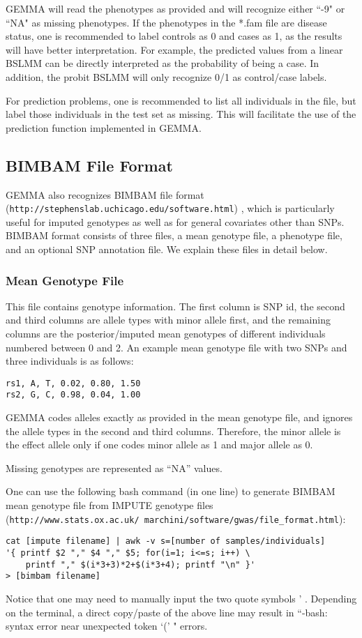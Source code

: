 \documentclass[11pt]{article}
\providecommand{\url}[1]{\texttt{#1}}
\begin{document}
GEMMA will read the phenotypes as provided and will recognize either
``-9" or ``NA" as missing phenotypes. If the phenotypes in the *.fam
file are disease status, one is recommended to label controls as 0 and
cases as 1, as the results will have better interpretation. For
example, the predicted values from a linear BSLMM can be directly
interpreted as the probability of being a case.  In addition, the
probit BSLMM will only recognize 0/1 as control/case labels.

For prediction problems, one is recommended to list all individuals in
the file, but label those individuals in the test set as missing. This
will facilitate the use of the prediction function implemented in
GEMMA.

\subsection{BIMBAM File Format}

GEMMA also recognizes BIMBAM file format
(\url{http://stephenslab.uchicago.edu/software.html})
\cite{Guan:2008}, which is particularly useful for imputed genotypes
as well as for general covariates other than SNPs. BIMBAM format
consists of three files, a mean genotype file, a phenotype file, and
an optional SNP annotation file. We explain these files in detail
below.

\subsubsection{Mean Genotype File}

This file contains genotype information. The first column is SNP id,
the second and third columns are allele types with minor allele first,
and the remaining columns are the posterior/imputed mean genotypes of
different individuals numbered between 0 and 2. An example mean
genotype file with two SNPs and three individuals is as follows:
%
\begin{verbatim}
rs1, A, T, 0.02, 0.80, 1.50
rs2, G, C, 0.98, 0.04, 1.00
\end{verbatim}
%
GEMMA codes alleles exactly as provided in the mean genotype file, and
ignores the allele types in the second and third columns. Therefore,
the minor allele is the effect allele only if one codes minor allele
as 1 and major allele as 0.

Missing genotypes are represented as ``NA'' values.

One can use the following bash command (in one line) to generate
BIMBAM mean genotype file from IMPUTE genotype files \\
(\url{http://www.stats.ox.ac.uk/~marchini/software/gwas/file_format.html})\cite{Howie:2009}:
%
\begin{verbatim}
cat [impute filename] | awk -v s=[number of samples/individuals]
'{ printf $2 "," $4 "," $5; for(i=1; i<=s; i++) \
    printf "," $(i*3+3)*2+$(i*3+4); printf "\n" }'
> [bimbam filename]
\end{verbatim}
%
Notice that one may need to manually input the two quote symbols '
. Depending on the terminal, a direct copy/paste of the above line may
result in ``-bash: syntax error near unexpected token `(' " errors.
\end{document}
